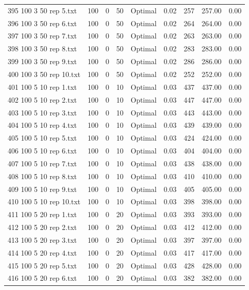 \begin{longtable}{lrrllrrrr}
395 100 3 50 rep 5.txt & 100 & 0 & 50 & Optimal &  0.02 & 257 & 257.00 &  0.00\\
396 100 3 50 rep 6.txt & 100 & 0 & 50 & Optimal &  0.02 & 264 & 264.00 &  0.00\\
397 100 3 50 rep 7.txt & 100 & 0 & 50 & Optimal &  0.02 & 263 & 263.00 &  0.00\\
398 100 3 50 rep 8.txt & 100 & 0 & 50 & Optimal &  0.02 & 283 & 283.00 &  0.00\\
399 100 3 50 rep 9.txt & 100 & 0 & 50 & Optimal &  0.02 & 286 & 286.00 &  0.00\\
400 100 3 50 rep 10.txt & 100 & 0 & 50 & Optimal &  0.02 & 252 & 252.00 &  0.00\\
401 100 5 10 rep 1.txt & 100 & 0 & 10 & Optimal &  0.03 & 437 & 437.00 &  0.00\\
402 100 5 10 rep 2.txt & 100 & 0 & 10 & Optimal &  0.03 & 447 & 447.00 &  0.00\\
403 100 5 10 rep 3.txt & 100 & 0 & 10 & Optimal &  0.03 & 443 & 443.00 &  0.00\\
404 100 5 10 rep 4.txt & 100 & 0 & 10 & Optimal &  0.03 & 439 & 439.00 &  0.00\\
405 100 5 10 rep 5.txt & 100 & 0 & 10 & Optimal &  0.03 & 424 & 424.00 &  0.00\\
406 100 5 10 rep 6.txt & 100 & 0 & 10 & Optimal &  0.03 & 404 & 404.00 &  0.00\\
407 100 5 10 rep 7.txt & 100 & 0 & 10 & Optimal &  0.03 & 438 & 438.00 &  0.00\\
408 100 5 10 rep 8.txt & 100 & 0 & 10 & Optimal &  0.03 & 410 & 410.00 &  0.00\\
409 100 5 10 rep 9.txt & 100 & 0 & 10 & Optimal &  0.03 & 405 & 405.00 &  0.00\\
410 100 5 10 rep 10.txt & 100 & 0 & 10 & Optimal &  0.03 & 398 & 398.00 &  0.00\\
411 100 5 20 rep 1.txt & 100 & 0 & 20 & Optimal &  0.03 & 393 & 393.00 &  0.00\\
412 100 5 20 rep 2.txt & 100 & 0 & 20 & Optimal &  0.03 & 412 & 412.00 &  0.00\\
413 100 5 20 rep 3.txt & 100 & 0 & 20 & Optimal &  0.03 & 397 & 397.00 &  0.00\\
414 100 5 20 rep 4.txt & 100 & 0 & 20 & Optimal &  0.03 & 417 & 417.00 &  0.00\\
415 100 5 20 rep 5.txt & 100 & 0 & 20 & Optimal &  0.03 & 428 & 428.00 &  0.00\\
416 100 5 20 rep 6.txt & 100 & 0 & 20 & Optimal &  0.03 & 382 & 382.00 &  0.00\\

\end{longtable}
